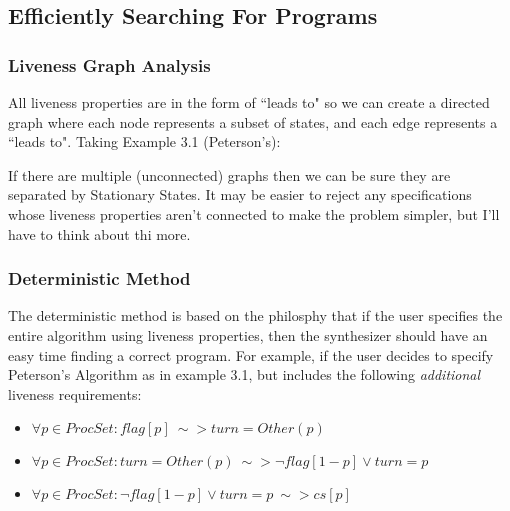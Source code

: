 \documentclass[12pt]{article}
\begin{document}
\subsection{Efficiently Searching For Programs}
\subsubsection{Liveness Graph Analysis}
All liveness properties are in the form of ``leads to" so we can create a directed graph where each node represents a subset of states, and each edge represents a ``leads to".  Taking Example 3.1 (Peterson's):

\begin{center}
\end{center}

If there are multiple (unconnected) graphs then we can be sure they are separated by Stationary States.  It may be easier to reject any specifications whose liveness properties aren't connected to make the problem simpler, but I'll have to think about thi more.  

\subsubsection{Deterministic Method}
The deterministic method is based on the philosphy that if the user specifies the entire algorithm using liveness properties, then the synthesizer should have an easy time finding a correct program.  For example, if the user decides to specify Peterson's Algorithm as in example 3.1, but includes the following \textit{additional} liveness requirements:
\begin{itemize}
	\item $\forall p \in ProcSet : flag[p] ~\sim> turn = Other(p)$
	\item $\forall p \in ProcSet : turn = Other(p) ~\sim> \lnot flag[1-p] \vee turn = p$
	\item $\forall p \in ProcSet : \lnot flag[1-p] \vee turn = p ~\sim> cs[p]$
\end{itemize}
\end{document}
